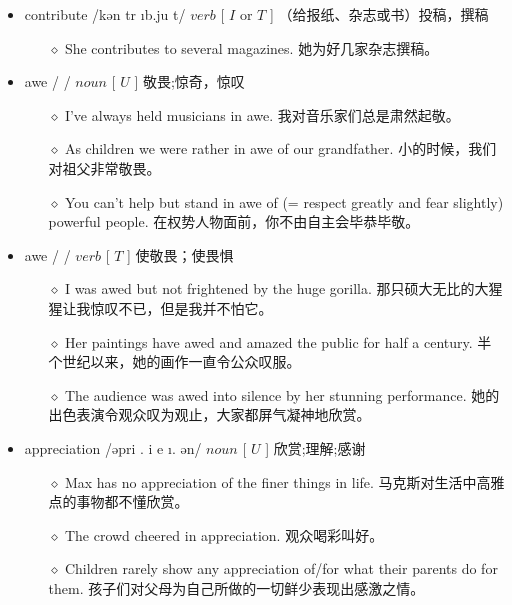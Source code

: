 \documentclass[a4paper,top=2.5cm,buttom=2.5cm10.5pt]{book}
\begin{document}
\begin{itemize}
\item contribute /kən \textprimstress tr \i b.ju \textlengthmark t/ $ verb $ [  $ I $  or  $ T $  ] （给报纸、杂志或书）投稿，撰稿
\begin{itemize}
\item[$\diamond$] She contributes to several magazines.
她为好几家杂志撰稿。
\end{itemize}
\end{itemize}
\begin{itemize}
\item awe / \textopeno  \textlengthmark / $ noun $ [  $ U $  ] 敬畏;惊奇，惊叹
\begin{itemize}
\item[$\diamond$] I've always held musicians in awe.
我对音乐家们总是肃然起敬。
\item[$\diamond$] As children we were rather in awe of our grandfather.
小的时候，我们对祖父非常敬畏。
\item[$\diamond$] You can't help but stand in awe of (= respect greatly and fear slightly) powerful people.
在权势人物面前，你不由自主会毕恭毕敬。
\end{itemize}
\end{itemize}
\begin{itemize}
\item awe / \textopeno  \textlengthmark / $ verb $ [  $ T $  ] 使敬畏；使畏惧
\begin{itemize}
\item[$\diamond$] I was awed but not frightened by the huge gorilla.
那只硕大无比的大猩猩让我惊叹不已，但是我并不怕它。
\item[$\diamond$] Her paintings have awed and amazed the public for half a century.
半个世纪以来，她的画作一直令公众叹服。
\item[$\diamond$] The audience was awed into silence by her stunning performance.
她的出色表演令观众叹为观止，大家都屏气凝神地欣赏。
\end{itemize}
\end{itemize}
\begin{itemize}
\item appreciation /ə\textsecstress pri \textlengthmark . \textesh i \textprimstress e \i . \textesh ən/ $ noun $ [  $ U $  ] 欣赏;理解;感谢
\begin{itemize}
\item[$\diamond$] Max has no appreciation of the finer things in life.
马克斯对生活中高雅点的事物都不懂欣赏。
\item[$\diamond$] The crowd cheered in appreciation.
观众喝彩叫好。
\item[$\diamond$] Children rarely show any appreciation of/for what their parents do for them.
孩子们对父母为自己所做的一切鲜少表现出感激之情。
\end{itemize}
\end{itemize}
\end{document}
